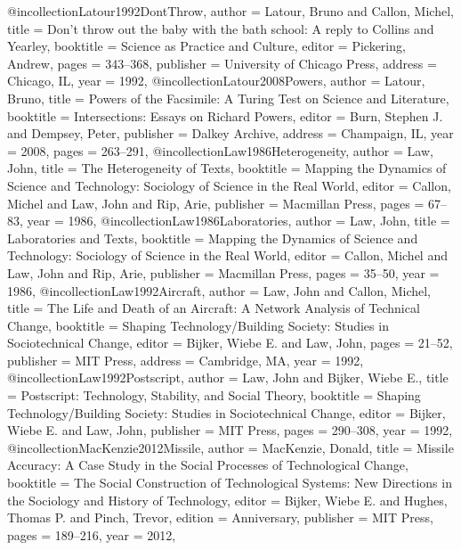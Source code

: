 @incollection{Latour1992DontThrow,
  author    = {Latour, Bruno and Callon, Michel},
  title     = {{Don't throw out the baby with the bath school: A reply to Collins and Yearley}},
  booktitle = {{Science as Practice and Culture}},
  editor    = {Pickering, Andrew},
  pages     = {343--368},
  publisher = {University of Chicago Press},
  address   = {Chicago, IL},
  year      = {1992},
}
@incollection{Latour2008Powers,
  author    = {Latour, Bruno},
  title     = {{Powers of the Facsimile: A Turing Test on Science and Literature}},
  booktitle = {{Intersections: Essays on Richard Powers}},
  editor    = {Burn, Stephen J. and Dempsey, Peter},
  publisher = {Dalkey Archive},
  address   = {Champaign, IL},
  year      = {2008},
  pages     = {263--291},
}
@incollection{Law1986Heterogeneity,
  author    = {Law, John},
  title     = {{The Heterogeneity of Texts}},
  booktitle = {{Mapping the Dynamics of Science and Technology: Sociology of Science in the Real World}},
  editor    = {Callon, Michel and Law, John and Rip, Arie},
  publisher = {Macmillan Press},
  pages     = {67--83},
  year      = {1986},
}
@incollection{Law1986Laboratories,
  author    = {Law, John},
  title     = {{Laboratories and Texts}},
  booktitle = {{Mapping the Dynamics of Science and Technology: Sociology of Science in the Real World}},
  editor    = {Callon, Michel and Law, John and Rip, Arie},
  publisher = {Macmillan Press},
  pages     = {35--50},
  year      = {1986},
}
@incollection{Law1992Aircraft,
  author    = {Law, John and Callon, Michel},
  title     = {{The Life and Death of an Aircraft: A Network Analysis of Technical Change}},
  booktitle = {{Shaping Technology/Building Society: Studies in Sociotechnical Change}},
  editor    = {Bijker, Wiebe E. and Law, John},
  pages     = {21--52},
  publisher = {MIT Press},
  address   = {Cambridge, MA},
  year      = {1992},
}
@incollection{Law1992Postscript,
  author    = {Law, John and Bijker, Wiebe E.},
  title     = {{Postscript: Technology, Stability, and Social Theory}},
  booktitle = {{Shaping Technology/Building Society: Studies in Sociotechnical Change}},
  editor    = {Bijker, Wiebe E. and Law, John},
  publisher = {MIT Press},
  pages     = {290--308},
  year      = {1992},
}
@incollection{MacKenzie2012Missile,
  author    = {MacKenzie, Donald},
  title     = {{Missile Accuracy: A Case Study in the Social Processes of Technological Change}},
  booktitle = {{The Social Construction of Technological Systems: New Directions in the Sociology and History of Technology}},
  editor    = {Bijker, Wiebe E. and Hughes, Thomas P. and Pinch, Trevor},
  edition   = {Anniversary},
  publisher = {MIT Press},
  pages     = {189--216},
  year      = {2012},
}
